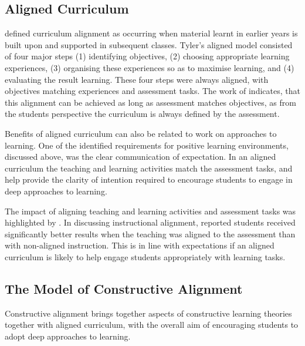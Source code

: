 
\subsection{Aligned Curriculum} %
\label{sub:aligned_curriculum}

\citet{Tyler:1969} defined curriculum alignment as occurring when material learnt in earlier years is built upon and supported in subsequent classes. Tyler's aligned model consisted of four major steps (1) identifying objectives, (2) choosing appropriate learning experiences, (3) organising these experiences so as to maximise learning, and (4) evaluating the result learning. These four steps were always aligned, with objectives matching experiences and assessment tasks. The work of \cite{Ramsden:1992} indicates, that this alignment can be achieved as long as assessment matches objectives, as from the students perspective the curriculum is always defined by the assessment.

Benefits of aligned curriculum can also be related to work on approaches to learning. One of the identified requirements for positive learning environments, discussed above, was the clear communication of expectation. In an aligned curriculum the teaching and learning activities match the assessment tasks, and help provide the clarity of intention required to encourage students to engage in deep approaches to learning.

The impact of aligning teaching and learning activities and assessment tasks was highlighted by \citet{Cohen:1987}. In discussing instructional alignment, \citet{Cohen:1987} reported students received significantly better results when the teaching was aligned to the assessment than with non-aligned instruction. This is in line with expectations if an aligned curriculum is likely to help engage students appropriately with learning tasks.


\subsection{The Model of Constructive Alignment} %
\label{sub:the_model_of_constructive_alignment}

Constructive alignment brings together aspects of constructive learning theories together with aligned curriculum, with the overall aim of encouraging students to adopt deep approaches to learning.

